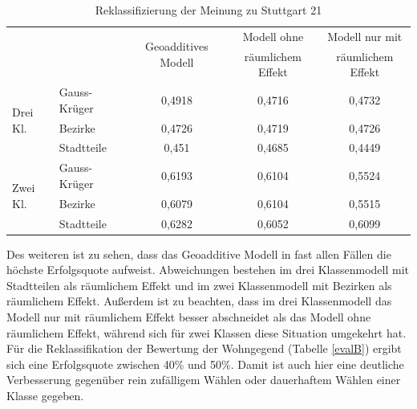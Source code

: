 \documentclass{Vorlage}
\begin{document}
\begin{table}[h]
\centering
\caption{Reklassifizierung der Meinung zu Stuttgart 21}
\label{evalS21}
\begin{tabular}{ll|c|c|c}
\hline \hline
                          &              & \multirow{2}{*}{Geoadditives Modell} & Modell ohne       & Modell nur mit    \\
                          &              &                                      & räumlichem Effekt & räumlichem Effekt \\ \hline
\multirow{3}{*}{Drei Kl.} & Gauss-Krüger & 0,4918                               & 0,4716            & 0,4732            \\
                          & Bezirke      & 0,4726                               & 0,4719            & 0,4726            \\
                          & Stadtteile   & 0,451                                & 0,4685            & 0,4449            \\ \hline
\multirow{3}{*}{Zwei Kl.} & Gauss-Krüger & 0,6193                               & 0,6104            & 0,5524            \\
                          & Bezirke      & 0,6079                               & 0,6104            & 0,5515            \\
                          & Stadtteile   & 0,6282                               & 0,6052            & 0,6099            \\ \hline \hline
\end{tabular}
\end{table}

Des weiteren ist zu sehen, dass das Geoadditive Modell in fast allen Fällen die höchste Erfolgsquote aufweist. Abweichungen bestehen im drei Klassenmodell mit Stadtteilen als räumlichem Effekt und im zwei Klassenmodell mit Bezirken als räumlichem Effekt. Außerdem ist zu beachten, dass im drei Klassenmodell das Modell nur mit räumlichem Effekt besser abschneidet als das Modell ohne räumlichem Effekt, während sich für zwei Klassen diese Situation umgekehrt hat.\\
Für die Reklassifikation der Bewertung der Wohngegend (Tabelle \ref{evalB}) ergibt sich eine Erfolgsquote zwischen 40\% und 50\%. Damit ist auch hier eine deutliche Verbesserung gegenüber rein zufälligem Wählen oder dauerhaftem Wählen einer Klasse gegeben. 
\end{document}
